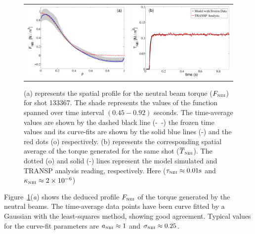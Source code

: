 \documentclass[12pt]{iopart}
\begin{document}
\begin{figure}
\begin{tabular}{cc}
\includegraphics[width=0.5\linewidth]{imene_figs/Goum7}& %
\includegraphics[width=0.5\linewidth]{imene_figs/Goum8}%
\end{tabular}
\caption{(a) represents the spatial profile for the neutral beam torque ($F_\textrm{\tiny{NBI}} $) for shot 133367.  The shade represents the values of the function spanned over time interval $(0.45-0.92)$ seconds.  The time-average values are shown by the dashed black line (-~-) the frozen time values and its curve-fits are shown by the solid blue lines (-) and the red dots (o) respectively. (b) represents the corresponding spatial average of the torque generated for the same shot ($ \overline{T}_\textrm{\tiny{NBI}}$). The dotted (o) and  solid (-) lines represent the model simulated and TRANSP analysis reading, respectively.  Here ($\tau_\textrm{\tiny{NBI}} \approx 0.01 \textrm{s}$ and $\kappa_\textrm{\tiny{NBI}} \approx 2\times10^{-6} $)}
\label{fig:Fnbi}
\end{figure}
Figure~{\ref{fig:Fnbi}}(\emph{a}) shows the deduced profile $F_\textrm{\tiny{NBI}}$ of the torque generated by the neutral beams. The time-average data points have been curve fitted by a Gaussian with the least-squares method, showing good agreement.  Typical values for the curve-fit parameters are $a_\textrm{\tiny{NBI}} \approx 1$ and $\sigma_\textrm{\tiny{NBI}} \approx 0.25$.
\end{document}
